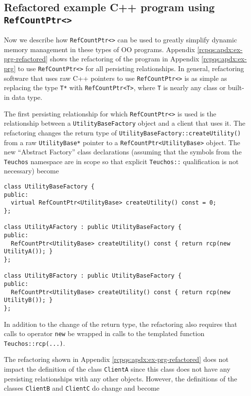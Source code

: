 \documentclass[pdf,ps2pdf,11pt]{SANDreport}
\begin{document}
%
\subsection{Refactored example C++ program using {}\texttt{Ref\-Count\-Ptr<>}}
\label{rcpbg:sec:refactored-program}
%

Now we describe how {}\texttt{Ref\-Count\-Ptr<>} can be used to
greatly simplify dynamic memory management in these types of OO
programs.  Appendix {}\ref{rcpqs:apdx:ex-prg-refactored} shows the
refactoring of the program in Appendix {}\ref{rcpqs:apdx:ex-prg} to
use {}\texttt{Ref\-Count\-Ptr<>} for all persisting relationships.
In general, refactoring software that uses raw C++ pointers to use
{}\texttt{Ref\-Count\-Ptr<>} is as simple as replacing the type
{}\texttt{T*} with {}\texttt{Ref\-Count\-Ptr<T>}, where {}\texttt{T}
is nearly any class or built-in data type.

The first persisting relationship for which
{}\texttt{Ref\-Count\-Ptr<>} is used is the relationship between a
{}\texttt{Utility\-Base\-Factory} object and a client that uses it.
The refactoring changes the return type of
{}\texttt{Utility\-Base\-Factory\-::createUtility()} from a raw
{}\texttt{Utility\-Base*} pointer to a
{}\texttt{Ref\-Count\-Ptr<Utility\-Base>} object.  The new ``Abstract
Factory'' class declarations (assuming that the symbols from the
{}\texttt{Teuchos} namespace are in scope so that explicit
{}\texttt{Teuchos::} qualification is not necessary) become

{\small\begin{verbatim}
class UtilityBaseFactory {
public:
  virtual RefCountPtr<UtilityBase> createUtility() const = 0;
};

class UtilityAFactory : public UtilityBaseFactory {
public:
  RefCountPtr<UtilityBase> createUtility() const { return rcp(new UtilityA()); }
};

class UtilityBFactory : public UtilityBaseFactory {
public:
  RefCountPtr<UtilityBase> createUtility() const { return rcp(new UtilityB()); }
};
\end{verbatim}}

In addition to the change of the return type, the refactoring also
requires that calls to operator {}\texttt{new} be wrapped in calls to
the templated function {}\texttt{Teuchos\-::rcp(...)}.

The refactoring shown in Appendix {}\ref{rcpqs:apdx:ex-prg-refactored}
does not impact the definition of the class {}\texttt{ClientA} since
this class does not have any persisting relationships with any
other objects.  However, the definitions of the classes
{}\texttt{ClientB} and {}\texttt{ClientC} do change and become
\end{document}
